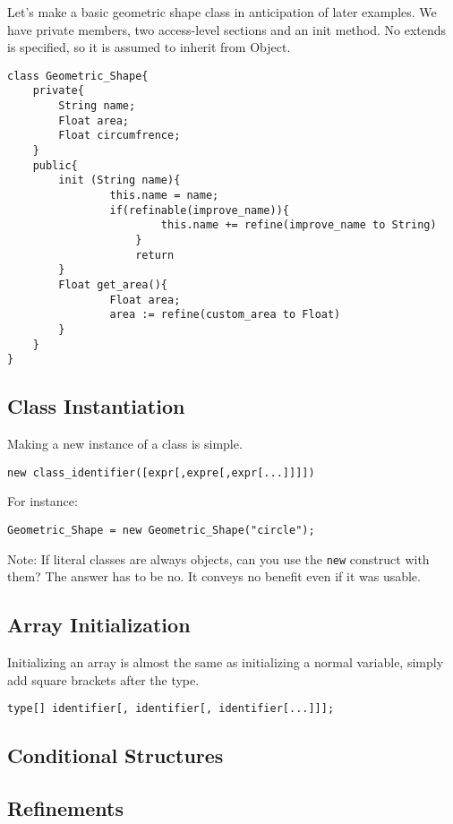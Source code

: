 Let's make a basic geometric shape class in anticipation of later examples. We have private members, two access-level sections and an init method. No extends is specified, so it is assumed to inherit from Object.


\begin{lstlisting}[label=Method Invocation,caption=Class Declaration for a Geometric Shape class]
class Geometric_Shape{
	private{
		String name;
		Float area;
		Float circumfrence;
	}
	public{
	    init (String name){
	    	    this.name = name;
	    	    if(refinable(improve_name)){
	    	    		this.name += refine(improve_name to String)
	    	    	} 
	    	    	return
	    }
	    Float get_area(){
	    		Float area;
	    		area := refine(custom_area to Float)
	    }
	}
}
\end{lstlisting}

\subsection{Class Instantiation}
Making a new instance of a class is simple.

\begin{lstlisting}
new class_identifier([expr[,expre[,expr[...]]]])
\end{lstlisting}

For instance:

\begin{lstlisting}[label=Method Invocation,caption=Class Instantiation for a Geometric Shape class]
Geometric_Shape = new Geometric_Shape("circle");
\end{lstlisting}

Note: If literal classes are always objects, can you use the \verb!new! construct with them? The answer has to be no. It conveys no benefit even if it was usable.

\subsection{Array Initialization}
Initializing an array is almost the same as initializing a normal variable, simply add square brackets after the type.

\begin{lstlisting}
type[] identifier[, identifier[, identifier[...]]];
\end{lstlisting}

\subsection{Conditional Structures}

\subsection{Refinements}
